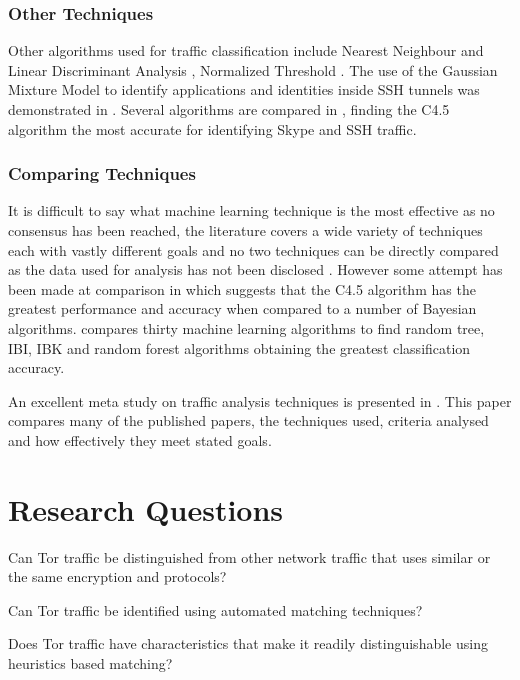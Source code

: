 \documentclass{ecuthesis}
\begin{document}
\subsubsection{Other Techniques}

Other algorithms used for traffic classification include Nearest Neighbour and
Linear Discriminant Analysis \parencite{Roughan:2004p3823}, Normalized
Threshold \parencite{Crotti:2007p3824}. The use of the Gaussian Mixture Model
to identify applications and identities inside SSH tunnels was demonstrated in
\textcite{Dusi:2008p6254}. Several algorithms are compared in
\textcite{Alshammari:2009p7474}, finding the C4.5 algorithm the most accurate
for identifying Skype and SSH traffic.

\subsubsection{Comparing Techniques}

It is difficult to say what machine learning technique is the most effective as
no consensus has been reached, the literature covers a wide variety of
techniques each with vastly different goals and no two techniques can be
directly compared as the data used for analysis has not been disclosed
\parencite{Kim:2007p3867}. However some attempt has been made at comparison in
\textcite{Williams:2006p3849} which suggests that the C4.5 algorithm has the
greatest performance and accuracy when compared to a number of Bayesian
algorithms. \textcite{Mohd:2009p6484} compares thirty machine learning
algorithms to find random tree, IBI, IBK and random forest algorithms
obtaining the greatest classification accuracy.

An excellent meta study on traffic analysis techniques is presented in
\textcite{Nguyen:2008p3837}. This paper compares many of the published papers,
the techniques used, criteria analysed and how effectively they meet stated
goals.

\section{Research Questions}

\begin{enumerate*}
  \item Can Tor traffic be distinguished from other network traffic that uses
    similar or the same encryption and protocols?
  \item Can Tor traffic be identified using automated matching techniques?
  \item Does Tor traffic have characteristics that make it readily distinguishable using
    heuristics based matching?
\end{enumerate*}
\end{document}
